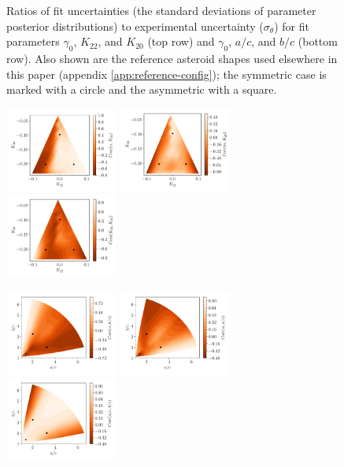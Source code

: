 \documentclass{aastex631}
\begin{document}
\begin{figure}
  \caption{Ratios of fit uncertainties (the standard deviations of parameter posterior distributions) to experimental uncertainty ($\sigma_\theta$) for fit parameters $\gamma_0$, $K_{22}$, and $K_{20}$ (top row) and $\gamma_0$, $a/c$, and $b/c$ (bottom row). Also shown are the reference asteroid shapes used elsewhere in this paper (appendix \ref{app:reference-config}); the symmetric case is marked with a circle and the asymmetric with a square.}
  \label{fig:probe-space-sigma}
\end{figure}

\begin{figure}
  \includegraphics[width=0.33\textwidth]{probe-space-corr12.pdf}\hfill
  \includegraphics[width=0.33\textwidth]{probe-space-corr13.pdf}\hfill
  \includegraphics[width=0.33\textwidth]{probe-space-corr23.pdf}
  
  \includegraphics[width=0.33\textwidth]{probe-space-ab-1b.pdf}\hfill
  \includegraphics[width=0.33\textwidth]{probe-space-ab-1a.pdf}\hfill
  \includegraphics[width=0.33\textwidth]{probe-space-ab-ab.pdf}
  

\end{figure}
\end{document}
